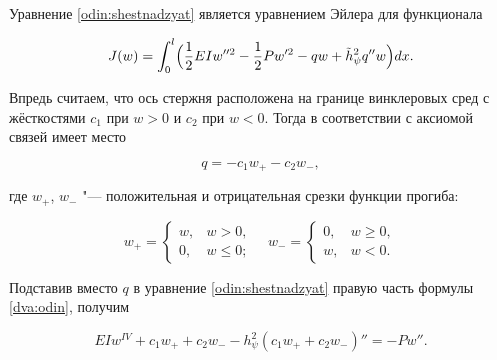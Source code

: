Уравнение \eqref{odin:shestnadzyat} является уравнением Эйлера для функционала

\begin{equation}\label{odin:semnadzyat}

J(w)=\int_0^l\Bigl(\frac12 EIw''^2-\frac12 Pw'^2-qw+\tilde{h}_{\psi}^2q''w\Bigr)dx.

\end{equation}




Впредь считаем, что ось стержня расположена на границе винклеровых сред с жёсткостями $c_1$ при $w>0$ и $c_2$ при $w<0$. Тогда в соответствии с аксиомой связей имеет место 

\begin{equation}\label{dva:odin}

q=-c_1w_+-c_2w_-,

\end{equation}

где $w_+$, $w_-$ "--- положительная и отрицательная срезки функции прогиба:

\begin{equation*} %

w_+=

\begin{cases}

w, & w>0,\\

0, & w\leq0;

\end{cases}\quad 

w_-=

\begin{cases}

0, & w\geq0,\\

w, & w<0.

\end{cases}

\end{equation*}



Подставив вместо $q$ в уравнение \eqref{odin:shestnadzyat} правую часть формулы \eqref{dva:odin}, получим

\begin{equation}\label{dva:tri}

EIw^{IV}+c_1w_++c_2w_--h_{\psi}^2(c_1w_++c_2w_-)''=-Pw''. 

\end{equation}



